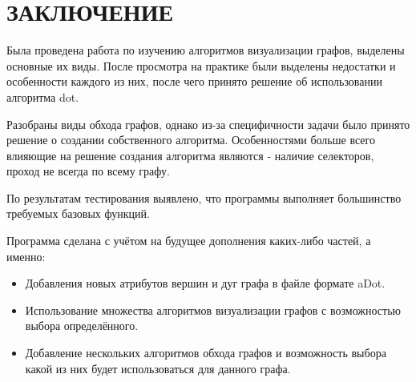 \chapter*{ЗАКЛЮЧЕНИЕ}\label{chap_conclusion}

Была проведена работа по изучению алгоритмов визуализации графов, выделены основные их виды. После просмотра на практике были выделены недостатки и особенности каждого из них, после чего принято решение об использовании алгоритма dot.

Разобраны виды обхода графов, однако из-за специфичности задачи было принято решение о создании собственного алгоритма. Особенностями больше всего влияющие на решение создания алгоритма являются - наличие селекторов, проход не всегда по всему графу.

По результатам тестирования выявлено, что программы выполняет большинство требуемых базовых функций.

Программа сделана с учётом на будущее дополнения каких-либо частей, а именно:
\begin{itemize}
\item Добавления новых атрибутов вершин и дуг графа в файле формате aDot.
\item Использование множества алгоритмов визуализации графов с возможностью выбора определённого.
\item Добавление нескольких алгоритмов обхода графов и возможность выбора какой из них будет использоваться для данного графа.
\end{itemize}
